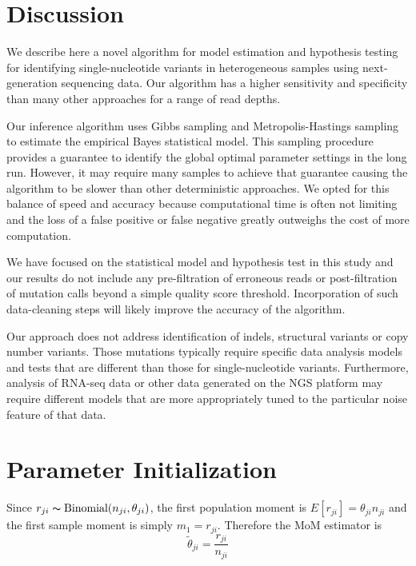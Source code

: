 \documentclass[11pt,reqno]{amsart}
\begin{document}
\section{Discussion}

We describe here a novel algorithm for model estimation and hypothesis testing for identifying single-nucleotide variants in heterogeneous samples using next-generation sequencing data. Our algorithm has a higher sensitivity and specificity than many other approaches for a range of read depths.

Our inference algorithm uses Gibbs sampling and Metropolis-Hastings sampling to estimate the empirical Bayes statistical model. This sampling procedure provides a guarantee to identify the global optimal parameter settings in the long run. However, it may require many samples to achieve that guarantee causing the algorithm to be slower than other deterministic approaches. We opted for this balance of speed and accuracy because computational time is often not limiting and the loss of a false positive or false negative greatly outweighs the cost of more computation.

We have focused on the statistical model and hypothesis test in this study and our results do not include any pre-filtration of erroneous reads or post-filtration of mutation calls beyond a simple quality score threshold. Incorporation of such data-cleaning steps will likely improve the accuracy of the algorithm.

Our approach does not address identification of indels, structural variants or copy number variants. Those mutations typically require specific data analysis models and tests that are different than those for single-nucleotide variants. Furthermore, analysis of RNA-seq data or other data generated on the NGS platform may require different models that are more appropriately tuned to the particular noise feature of that data.

\appendix

\section{Parameter Initialization}\label{sec:appendix_mom}
Since $r_{ji} \thicksim \text{Binomial}(n_{ji}, \theta_{ji})$, the first population moment is  $E[r_{ji}] = \theta_{ji} n_{ji}$ and the first sample moment is simply $m_1 = r_{ji}$. Therefore the MoM estimator is 
\begin{equation}
	\tilde{\theta}_{ji} = \frac{r_{ji}} {n_{ji}}
\end{equation}
\end{document}

